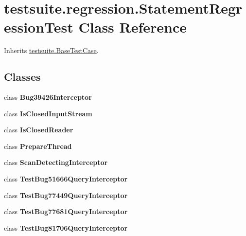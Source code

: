 \hypertarget{classtestsuite_1_1regression_1_1_statement_regression_test}{}\section{testsuite.\+regression.\+Statement\+Regression\+Test Class Reference}
\label{classtestsuite_1_1regression_1_1_statement_regression_test}


Inherits \mbox{\hyperlink{classtestsuite_1_1_base_test_case}{testsuite.\+Base\+Test\+Case}}.

\subsection*{Classes}
\begin{DoxyCompactItemize}
\item 
class {\bfseries Bug39426\+Interceptor}
\item 
class {\bfseries Is\+Closed\+Input\+Stream}
\item 
class {\bfseries Is\+Closed\+Reader}
\item 
class {\bfseries Prepare\+Thread}
\item 
class {\bfseries Scan\+Detecting\+Interceptor}
\item 
class {\bfseries Test\+Bug51666\+Query\+Interceptor}
\item 
class {\bfseries Test\+Bug77449\+Query\+Interceptor}
\item 
class {\bfseries Test\+Bug77681\+Query\+Interceptor}
\item 
class {\bfseries Test\+Bug81706\+Query\+Interceptor}
\end{DoxyCompactItemize}
